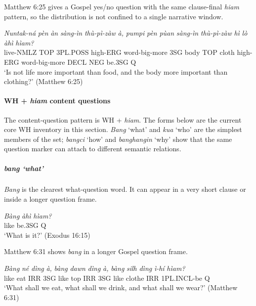\documentclass[
  11pt,
  a4paper,
]{article}
\newcommand{\tdim}[1]{\textit{#1}}
\newcommand{\tdimword}[1]{\textit{#1}}
\renewcommand{\textsc}[1]{{\footnotesize\MakeUppercase{#1}}}
\newcommand{\glossquote}[1]{`#1'}
\begin{document}
Matthew 6:25 gives a Gospel yes/no question with the same clause-final
\tdim{hiam} pattern, so the distribution is not confined to a single
narrative window.

\begin{exe}
\ex \label{ex:int-hiam-matt6-25}
\gll \tdimword{Nuntak-ná} \tdimword{pèn} \tdimword{àn} \tdimword{sàng-ìn} \tdimword{thù-pì-zàw} \tdimword{à,} \tdimword{pumpi} \tdimword{pèn} \tdimword{pùan} \tdimword{sàng-ìn} \tdimword{thù-pì-zàw} \tdimword{hì} \tdimword{lò} \tdimword{àhì} \tdimword{hìam?} \\
     live-\textsc{nmlz} \textsc{top} \textsc{3pl}.\textsc{poss} high-\textsc{erg} word-big-more \textsc{3sg} body \textsc{top} cloth high-\textsc{erg} word-big-more \textsc{decl} \textsc{neg} be.\textsc{3sg} \textsc{q} \\
\glt \glossquote{Is not life more important than food, and the body more important than clothing?} (Matthew 6:25)
\end{exe}

\paragraph{\texorpdfstring{WH + \tdim{hiam} content
questions}{WH +  content questions}}\label{wh-content-questions}

The content-question pattern is WH + \tdim{hiam}. The forms below are
the current core WH inventory in this section. \tdim{Bang}
\glossquote{what} and \tdim{kua} \glossquote{who} are the simplest
members of the set; \tdim{bangci} \glossquote{how} and \tdim{banghangin}
\glossquote{why} show that the same question marker can attach to
different semantic relations.

\subparagraph{\texorpdfstring{\tdim{bang}
\glossquote{what}}{ }}\label{section}

\tdim{Bang} is the clearest what-question word. It can appear in a very
short clause or inside a longer question frame.

\begin{exe}
\ex \label{ex:int-bang-exod16-15}
\gll \tdimword{Bàng} \tdimword{àhì} \tdimword{hìam?} \\
     like be.\textsc{3sg} \textsc{q} \\
\glt \glossquote{What is it?} (Exodus 16:15)
\end{exe}

Matthew 6:31 shows \tdim{bang} in a longer Gospel question frame.

\begin{exe}
\ex \label{ex:int-bang-matt6-31}
\gll \tdimword{Bàng} \tdimword{né} \tdimword{dìng} \tdimword{à,} \tdimword{bàng} \tdimword{dawn} \tdimword{dìng} \tdimword{à,} \tdimword{bàng} \tdimword{silh} \tdimword{dìng} \tdimword{ì-hí} \tdimword{hìam?} \\
     like eat \textsc{irr} \textsc{3sg} like top \textsc{irr} \textsc{3sg} like clothe \textsc{irr} \textsc{1pl}.\textsc{incl}-be \textsc{q} \\
\glt \glossquote{What shall we eat, what shall we drink, and what shall we wear?} (Matthew 6:31)
\end{exe}
\end{document}
